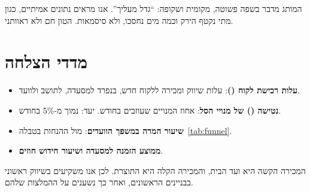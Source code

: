 המותג מדבר בשפה פשוטה, מקומית ושקופה: \enquote{גדל מעליך}. אנו מראים נתונים אמיתיים, כגון מתי נקטף הירק וכמה מים נחסכו, ולא סיסמאות. הטון חם ולא ראוותני.

\section{מדדי הצלחה}\label{sec:kpis}

\begin{itemize}
  \item \textbf{עלות רכישת לקוח ()}: עלות שיווק ומכירה ללקוח חדש, בנפרד למסעדה, לתושב ולוועד.
  \item \textbf{נטישה () של מנויי הסל}: אחוז המנויים שעוזבים בחודש. יעד: נמוך מ-5\% בחודש.
  \item \textbf{שיעור המרה במשפך הוועדים}: מול ההנחות בטבלה~\ref{tab:funnel}.
  \item \textbf{ממוצע הזמנה למסעדה ושיעור חידוש חוזים}.
\end{itemize}

\begin{insightbox}[תובנה]
המכירה הקשה היא ועד הבית, והמכירה הקלה היא התוצרת. לכן אנו משקיעים בשיווק ראשוני בבניינים הראשונים, ואחר כך נשענים על ההמלצות שלהם.
\end{insightbox}
